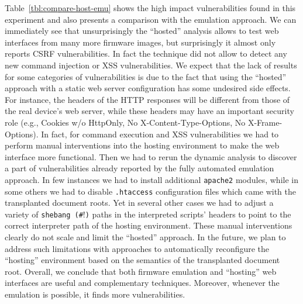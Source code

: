 \documentclass[conference]{./templates/ndss/IEEEtran}
\newcounter{t0d0_counter}
\newcounter{pr00f_counter}
\begin{document}
Table~\ref{tbl:compare-host-emu} shows the high impact vulnerabilities found
in this experiment and also presents a comparison with the emulation approach.  We can
immediately see that unsurprisingly the ``hosted'' analysis allows to test web interfaces from many more 
firmware images, but surprisingly it almost only reports CSRF
vulnerabilities. In fact the technique did not allow to detect any new command injection or XSS vulnerabilities.
We expect that the lack of results for some categories of vulnerabilities
is due to the fact that using the ``hosted'' approach
with a static web server configuration has some undesired
side effects. For instance, the headers of the HTTP responses will be
different from those of the real device's web server, while these headers may 
have an important security role (e.g., Cookies w/o HttpOnly, No
X-Content-Type-Options, No X-Frame-Options). In fact, for command execution 
and XSS vulnerabilities we had to perform manual interventions into 
the hosting environment to make the web interface more functional. Then we had 
to rerun the dynamic analysis to discover a part of vulnerabilities 
already reported by the fully automated emulation approach. 
In few instances we had to install additional \texttt{apache2} modules, while 
in some others we had to disable \texttt{.htaccess} configuration 
files which came with the transplanted document roots. 
Yet in several other cases we had to adjust a variety of \texttt{shebang (\#$!$)} 
paths in the interpreted scripts' headers to point to the correct interpreter 
path of the hosting environment. 
These manual interventions clearly do not scale and limit the ``hosted'' 
approach. In the future, we plan to address such limitations with 
approaches to automatically reconfigure the ``hosting'' environment 
based on the semantics of the transplanted document root. 
Overall, we conclude that both firmware emulation and ``hosting'' web
interfaces are useful and complementary techniques. Moreover, whenever
the emulation is possible, it finds more vulnerabilities.
\end{document}
